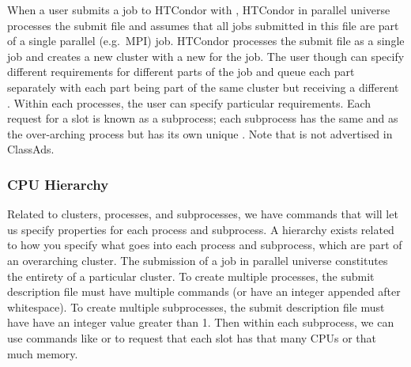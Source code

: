 When 
a user submits a job to HTCondor with , HTCondor in parallel 
universe processes the submit file and assumes that all jobs submitted in this 
file are part of a single parallel (e.g.~MPI) job. HTCondor processes the submit 
file as a single job and
creates a new cluster with a new  for the job. The user though can 
specify different requirements for different parts of the job and queue each 
part separately with each part being part of the same cluster but receiving a 
different . Within each processes, the user can specify particular
requirements.
Each request for a slot is known as a subprocess; each subprocess has the same 
 and  as the over-arching process but has its 
own unique 
. Note that  is not advertised in ClassAds.



\subsubsection{CPU Hierarchy}



Related to clusters, processes, and subprocesses, we have commands that will 
let us specify properties for each process and subprocess. A hierarchy exists 
related to how you specify what goes into each process and subprocess, which are
part of an overarching cluster. The submission of a job in parallel universe 
constitutes the entirety of a particular cluster. To create multiple processes,
the submit description file must have multiple  commands (or have
an integer appended after whitespace). To create multiple subprocesses, the 
submit description file must have  have an integer
value greater than 1. Then within each subprocess, we can use commands like
 or  to request that each 
slot has that many CPUs or that much memory.

